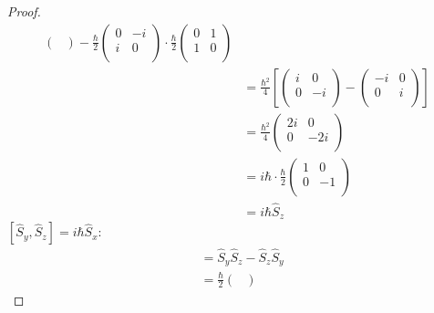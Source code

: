 \documentclass[../psets.tex]{subfiles}
\begin{document}
\begin{enumerate}
\begin{enumerate}
\begin{proof}
\begin{align*}
\begin{pmatrix}
                \end{pmatrix}
                -\frac{\hbar}{2}
                \begin{pmatrix}
                    0 & -i\\
                    i & 0\\
                \end{pmatrix}
                \cdot\frac{\hbar}{2}
                \begin{pmatrix}
                    0 & 1\\
                    1 & 0\\
                \end{pmatrix}\\
                &= \frac{\hbar^2}{4}\left[
                    \begin{pmatrix}
                        i & 0\\
                        0 & -i\\
                    \end{pmatrix}
                    -
                    \begin{pmatrix}
                        -i & 0\\
                        0 & i\\
                    \end{pmatrix}
                \right]\\
                &= \frac{\hbar^2}{4}
                \begin{pmatrix}
                    2i & 0\\
                    0 & -2i\\
                \end{pmatrix}\\
                &= i\hbar\cdot\frac{\hbar}{2}
                \begin{pmatrix}
                    1 & 0\\
                    0 & -1\\
                \end{pmatrix}\\
                &= i\hbar\hat{S}_z
            \end{align*}
            \underline{$[\hat{S}_y,\hat{S}_z]=i\hbar\hat{S}_x$}:
            \begin{align*}
                [\hat{S}_y,\hat{S}_z] &= \hat{S}_y\hat{S}_z-\hat{S}_z\hat{S}_y\\
                &= \frac{\hbar}{2}
                \begin{pmatrix}

\end{pmatrix}
\end{align*}
\end{proof}
\end{enumerate}
\end{enumerate}
\end{document}
